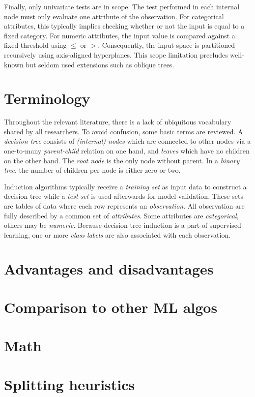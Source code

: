 Finally, only univariate tests are in scope. The test performed in each internal node must only evaluate one attribute of the observation. For categorical attributes, this typically implies checking whether or not the input is equal to a fixed category. For numeric attributes, the input value is compared against a fixed threshold using \(\leq\) or \(>\). Consequently, the input space is partitioned recursively using axis-aligned hyperplanes. This scope limitation precludes well-known but seldom used extensions such as oblique trees.

\section{Terminology}
Throughout the relevant literature, there is a lack of ubiquitous vocabulary shared by all researchers. To avoid confusion, some basic terms are reviewed. A \emph{decision tree} consists of \emph{(internal) nodes} which are connected to other nodes via a one-to-many \emph{parent-child} relation on one hand, and \emph{leaves} which have no children on the other hand. The \emph{root node} is the only node without parent. In a \emph{binary tree}, the number of children per node is either zero or two.

Induction algorithms typically receive a \emph{training set} as input data to construct a decision tree while a \emph{test set} is used afterwards for model validation. These sets are tables of data where each row represents an \emph{observation}. All observation are fully described by a common set of \emph{attributes}. Some attributes are \emph{categorical}, others may be \emph{numeric}. Because decision tree induction is a part of supervised learning, one or more \emph{class labels} are also associated with each observation.

\section{Advantages and disadvantages} %
\section{Comparison to other ML algos}
\section{Math}
\section{Splitting heuristics}
